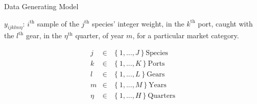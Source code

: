 \documentclass[ xcolor = pdftex, dvipsnames, table ]{beamer}
\begin{document}
\begin{frame}{Data Generating Model}
{%
\begin{minipage}[h!]{0.55\textwidth}
	$~$\\
	$y_{ijklm\eta}$: $i^{\text{th}}$ sample of the $j^{\text{th}}$ species' integer weight, in the $k^{\text{th}}$ port, caught with the $l^{\text{th}}$ gear, in the $\eta^{\text{th}}$ \mbox{quarter,} of year $m$, for a particular market \mbox{category.}
\end{minipage}
\begin{minipage}{0.45\textwidth}
	\vspace{-0.5cm}
	\hspace{4cm}
        \begin{eqnarray*}
        j &\in&\left\{1, ..., J\right\} \text{Species}\\
        k &\in&\left\{1, ..., K\right\} \text{Ports}\\
        l &\in&\left\{1, ..., L\right\} \text{Gears}\\
        m &\in&\left\{1, ..., M\right\} \text{Years}\\
        \eta &\in&\left\{1, ..., H\right\} \text{Quarters}
        \end{eqnarray*}
\end{minipage}
}
\end{frame}
\end{document}
